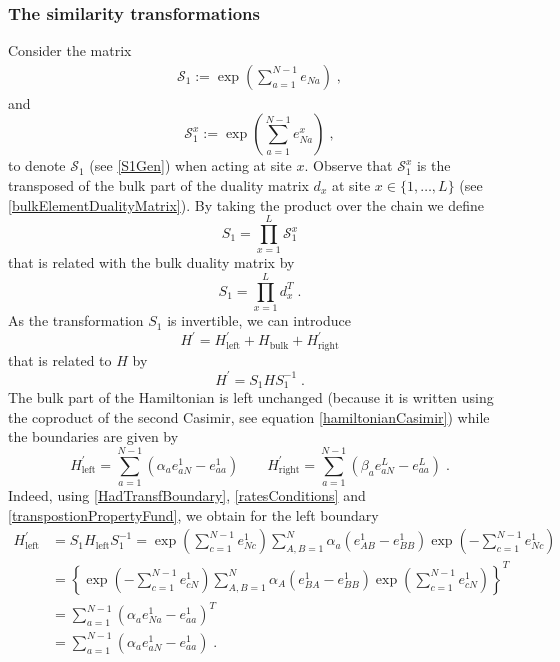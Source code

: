 \documentclass[10pt]{article}
\numberwithin{equation}{section}
\numberwithin{equation}{subsection}
\newcommand{\co}{\;,}
\newcommand{\dt}{\;.}
\begin{document}
\subsubsection{The similarity transformations}\label{subsectionSTransf}
Consider the matrix
\begin{align}
	\mathcal{S}_{1}:=\exp{\left(\sum_{a=1}^{N-1}e_{Na}\right)}\label{S1Gen}\co
\end{align}
and
\begin{equation}\label{transformationV}
 \mathcal{S}_{1}^{x}:=\exp{\left(\sum_{a=1}^{N-1}e_{Na}^{x}\right)}\co %
\end{equation}
to denote $\mathcal{S}_{1}$ (see \eqref{S1Gen}) when acting at site $x$. 
Observe that $\mathcal{S}_{1}^{x}$ is the transposed of the bulk part of the duality matrix $d_{x}$  at site $x\in \{1,\ldots,L\}$ (see \eqref{bulkElementDualityMatrix}). By taking the product over the chain we define
\begin{equation}\label{S1-Whole}
    S_{1}=\prod_{x=1}^{L}\mathcal{S}_{1}^{x}
\end{equation}
that is related with the bulk duality matrix by 
\begin{equation}
S_{1}=\prod_{x=1}^{L}d_{x}^{T}\dt
\end{equation}
 As the transformation $S_{1}$ is invertible,  we can introduce 
\begin{equation}\label{hatHamiltonian}
   H^{'}=H^{'}_{\text{left}}+H_{\text{bulk}}+H^{'}_{\text{right}}
\end{equation}
that is related to $H$ by
\begin{equation}\label{similarV}
   H^{'}=S_{1}HS_{1}^{-1}\dt
\end{equation}
The bulk part of the Hamiltonian is left unchanged (because it is written using the coproduct of the second Casimir, see equation \eqref{hamiltonianCasimir}) while the boundaries are given by 
\begin{equation}\label{eq:Hprimes}
	H^{'}_{\text{left}}=\sum_{a=1}^{N-1}\left(\alpha_{a}e_{aN}^{1}-e_{aa}^{1}\right)\qquad H^{'}_{\text{right}}=\sum_{a=1}^{N-1}\left(\beta_{a}e_{aN}^{L}-e_{aa}^{L}\right)\dt
\end{equation}
Indeed, using \eqref{HadTransfBoundary}, \eqref{ratesConditions} and \eqref{transpostionPropertyFund}, we obtain for the left boundary
\begin{equation}
	\begin{split}
		H_{\text{left}}^{'}&=S_{1}H_{\text{left}}S_{1}^{-1}=\exp{\left(\sum_{c=1}^{N-1}e_{Nc}^{1}\right)}\sum_{A,B=1}^{N}\alpha_{a}\left(e_{AB}^{1}-e_{BB}^{1}\right)\exp{\left(-\sum_{c=1}^{N-1}e_{Nc}^{1}\right)}
		\\&=
		\left\{\exp{\left(-\sum_{c=1}^{N-1}e_{cN}^{1}\right)}\sum_{A,B=1}^{N}\alpha_{A}\left(e_{BA}^{1}-e_{BB}^{1}\right)\exp{\left(\sum_{c=1}^{N-1}e_{cN}^{1}\right)}\right\}^{T}
		\\&=
		\sum_{a=1}^{N-1}\left(\alpha_{a}e_{Na}^{1}-e_{aa}^{1}\right)^{T}
		\\&=
		\sum_{a=1}^{N-1}\left(\alpha_{a}e_{aN}^{1}-e_{aa}^{1}\right)\dt
	\end{split}
\end{equation}
\end{document}
